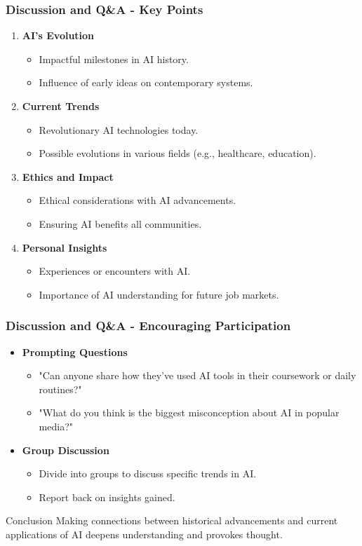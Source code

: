 \documentclass[aspectratio=169]{beamer}
\begin{document}
\begin{frame}[fragile]
  \frametitle{Discussion and Q\&A - Key Points}
  \begin{enumerate}
    \item \textbf{AI's Evolution}
      \begin{itemize}
        \item Impactful milestones in AI history.
        \item Influence of early ideas on contemporary systems.
      \end{itemize}
    \item \textbf{Current Trends}
      \begin{itemize}
        \item Revolutionary AI technologies today.
        \item Possible evolutions in various fields (e.g., healthcare, education).
      \end{itemize}
    \item \textbf{Ethics and Impact}
      \begin{itemize}
        \item Ethical considerations with AI advancements.
        \item Ensuring AI benefits all communities.
      \end{itemize}
    \item \textbf{Personal Insights}
      \begin{itemize}
        \item Experiences or encounters with AI.
        \item Importance of AI understanding for future job markets.
      \end{itemize}
  \end{enumerate}
\end{frame}

\begin{frame}[fragile]
  \frametitle{Discussion and Q\&A - Encouraging Participation}
  \begin{itemize}
    \item \textbf{Prompting Questions}
      \begin{itemize}
        \item "Can anyone share how they've used AI tools in their coursework or daily routines?" 
        \item "What do you think is the biggest misconception about AI in popular media?"
      \end{itemize}
    \item \textbf{Group Discussion}
      \begin{itemize}
        \item Divide into groups to discuss specific trends in AI.
        \item Report back on insights gained.
      \end{itemize}
  \end{itemize}
  
  \begin{block}{Conclusion}
    Making connections between historical advancements and current applications of AI deepens understanding and provokes thought. 
  \end{block}
\end{frame}
\end{document}
